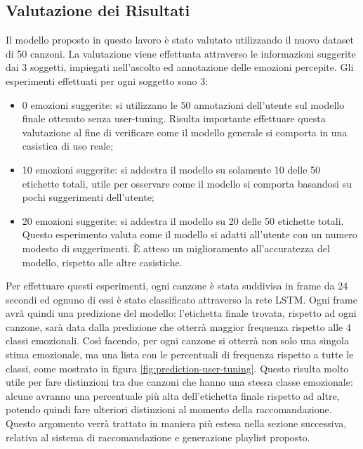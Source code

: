 \documentclass[11pt]{report}
\begin{document}
\newpage

\subsection{Valutazione dei Risultati}


Il modello proposto in questo lavoro è stato valutato utilizzando il nuovo dataset di 50 canzoni. La valutazione viene effettuata attraverso le informazioni suggerite dai 3 soggetti, impiegati nell'ascolto ed annotazione delle emozioni percepite. Gli esperimenti effettuati per ogni soggetto sono 3:
\begin{itemize}
    \item 0 emozioni suggerite: si utilizzano le 50 annotazioni dell'utente sul modello finale ottenuto senza user-tuning. Risulta importante effettuare questa valutazione al fine di verificare come il modello generale si comporta in una casistica di uso reale;
    
    \item 10 emozioni suggerite: si addestra il modello su solamente 10 delle 50 etichette totali, utile per osservare come il modello si comporta basandosi su pochi suggerimenti dell'utente;
    
    \item 20 emozioni suggerite: si addestra il modello su 20 delle 50 etichette totali. Questo esperimento valuta come il modello si adatti all'utente con un numero modesto di suggerimenti. È atteso un miglioramento all'accuratezza del modello, rispetto alle altre casistiche.
\end{itemize}

Per effettuare questi esperimenti, ogni canzone è stata suddivisa in frame da 24 secondi ed ognuno di essi è stato classificato attraverso la rete LSTM. Ogni frame avrà quindi una predizione del modello: l'etichetta finale trovata, rispetto ad ogni canzone, sarà data dalla predizione che otterrà maggior frequenza rispetto alle 4 classi emozionali. Così facendo, per ogni canzone si otterrà non solo una singola stima emozionale, ma una lista con le percentuali di frequenza rispetto a tutte le classi, come mostrato in figura \ref{fig:prediction-user-tuning}. Questo risulta molto utile per fare distinzioni tra due canzoni che hanno una stessa classe emozionale: alcune avranno una percentuale più alta dell'etichetta finale rispetto ad altre, potendo quindi fare ulteriori distinzioni al momento della raccomandazione. Questo argomento verrà trattato in maniera più estesa nella sezione successiva, relativa al sistema di raccomandazione e generazione playlist proposto.
\end{document}
